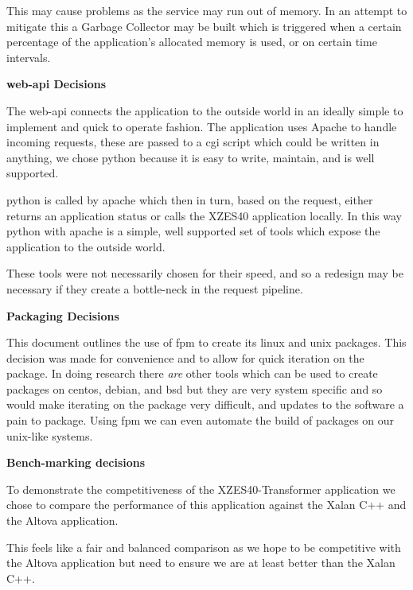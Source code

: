 This may cause problems as the service may run out of memory.
In an attempt to mitigate this a Garbage Collector may be built which is triggered when a certain percentage of the application's allocated memory is used, or on certain time intervals.
 
\textbf{\gls{web-api} Decisions}

The \gls{web-api} connects the application to the outside world in an ideally simple to implement and quick to operate fashion.
The application uses Apache to handle incoming requests, these are passed to a \gls{cgi} script which could be written in anything, we chose \gls{python} because it is easy to write, maintain, and is well supported.

\gls{python} is called by \gls{apache} which then in turn, based on the request, either returns an application status or calls the XZES40 application locally.
In this way \gls{python} with \gls{apache} is a simple, well supported set of tools which expose the application to the outside world.

These tools were not necessarily chosen for their speed, and so a redesign may be necessary if they create a bottle-neck in the request pipeline.

\textbf{Packaging Decisions}

This document outlines the use of \gls{fpm} to create its \gls{linux} and \gls{unix} packages.
This decision was made for convenience and to allow for quick iteration on the package.
In doing research there \textit{are} other tools which can be used to create packages on \gls{centos}, \gls{debian}, and \gls{bsd} but they are very system specific and so would make iterating on the package very difficult, and updates to the software a pain to package.
Using \gls{fpm} we can even automate the build of packages on our \gls{unix}-like systems.

\textbf{Bench-marking decisions}

To demonstrate the competitiveness of the XZES40-Transformer application we chose to compare the performance of this application against the Xalan C++ and the Altova application.

This feels like a fair and balanced comparison as we hope to be competitive with the Altova application but need to ensure we are at least better than the Xalan C++.
